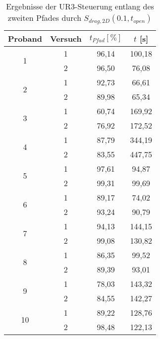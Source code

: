 \begin{table}[htb]
	\caption{Ergebnisse der UR3-Steuerung entlang des zweiten Pfades durch $S_{drag,2D}(0.1,t_{open})$}
	\label{table pfad rob2}
	\begin{center}
		\begin{tabular}{ |c|c|c|c| }
			\hline
			Proband & Versuch & $t_{Pfad}[\%]$ & $t$ [s] \\ 
			\hline
			\multirow{2}{*}{1} 
			& 1 & 96,14 & 100,18 \\
			& 2 & 96,50 & 76,08 \\
			\hline
			
			\multirow{2}{*}{2} 
			& 1 & 92,73 & 66,61 \\
			& 2 & 89,98 & 65,34 \\
			\hline	
			
			\multirow{2}{*}{3} 
			& 1 & 60,74 & 169,92 \\
			& 2 & 76,92 & 172,52 \\
			\hline
			
			\multirow{2}{*}{4} 
			& 1 & 87,79 & 344,19 \\
			& 2 & 83,55 & 447,75 \\
			\hline
			
			\multirow{2}{*}{5} 
			& 1 & 97,61 & 94,87 \\
			& 2 & 99,31 & 99,69 \\
			\hline
			
			\multirow{2}{*}{6} 
			& 1 & 89,17 & 74,02 \\
			& 2 & 93,24 & 90,79 \\
			\hline
			
			\multirow{2}{*}{7} 
			& 1 & 94,13 & 144,15 \\
			& 2 & 99,08 & 130,82 \\
			\hline
			
			\multirow{2}{*}{8} 
			& 1 & 86,35 & 99,52 \\
			& 2 & 89,39 & 93,01 \\
			\hline
			
			\multirow{2}{*}{9} 
			& 1 & 78,03 & 143,32 \\
			& 2 & 84,55 & 142,27 \\
			\hline
			
			\multirow{2}{*}{10} 
			& 1 & 89,22 & 128,76 \\
			& 2 & 98,48 & 122,13 \\
			\hline
		\end{tabular}
	\end{center}
\end{table}

